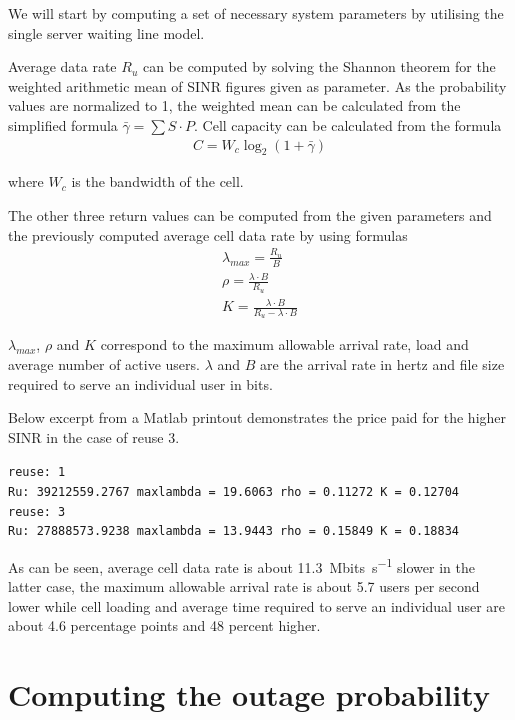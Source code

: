 \documentclass{article}
\begin{document}
We will start by computing a set of necessary system parameters by utilising the single server waiting line model.

Average data rate \(R_u\) can be computed by solving the Shannon theorem for the weighted arithmetic mean of SINR figures given as parameter. As the probability values are normalized to 1, the weighted mean can be calculated from the simplified formula \(\bar{\gamma} = \sum S \cdot P\). Cell capacity can be calculated from the formula
\begin{gather*}
    C = W_c \log_2(1 + \bar{\gamma})
\end{gather*}

where \(W_c\) is the bandwidth of the cell.

\newpage
The other three return values can be computed from the given parameters and the previously computed average cell data rate by using formulas
\begin{gather*}
    \lambda_{max} = \frac{R_u}{B} \\
    \rho = \frac{\lambda \cdot B}{R_u} \\
    K = \frac{\lambda \cdot B}{R_u - \lambda \cdot B}
\end{gather*}

\(\lambda_{max}\), \(\rho\) and \(K\) correspond to the maximum allowable arrival rate, load and average number of active users. \(\lambda\) and \(B\) are the arrival rate in hertz and file size required to serve an individual user in bits.

Below excerpt from a Matlab printout demonstrates the price paid for the higher SINR in the case of reuse 3.

\texttt{reuse: 1 \\
Ru: 39212559.2767 maxlambda = 19.6063 rho = 0.11272 K = 0.12704 \\
reuse: 3 \\
Ru: 27888573.9238 maxlambda = 13.9443 rho = 0.15849 K = 0.18834}

As can be seen, average cell data rate is about \SI{11.3}{Mbits\per \second} slower in the latter case, the maximum allowable arrival rate is about 5.7 users per second lower while cell loading and average time required to serve an individual user are about 4.6 percentage points and 48 percent higher.

\section{Computing the outage probability}
\end{document}
